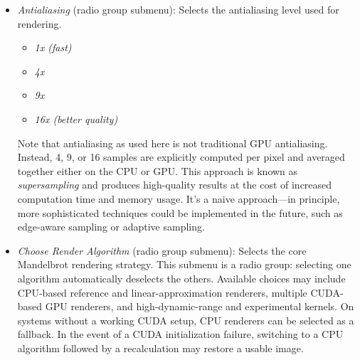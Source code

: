 \begin{itemize}
  \item \emph{Antialiasing} (radio group submenu): Selects the antialiasing
  level used for rendering.
    \begin{itemize}
      \item \emph{1x (fast)}
      \item \emph{4x}
      \item \emph{9x}
      \item \emph{16x (better quality)}
    \end{itemize}

  Note that antialiasing as used here is not traditional GPU antialiasing.
  Instead, 4, 9, or 16 samples are explicitly computed per pixel and averaged
  together either on the CPU or GPU.  This approach is known as
  \emph{supersampling} and produces high-quality results at the cost of
  increased computation time and memory usage.  It's a naive approach---in
  principle, more sophisticated techniques could be implemented in the future,
  such as edge-aware sampling or adaptive sampling.

  \item \emph{Choose Render Algorithm} (radio group submenu): Selects the core
  Mandelbrot rendering strategy. This submenu is a radio group: selecting one algorithm
  automatically deselects the others. Available choices may include CPU-based
  reference and linear-approximation renderers, multiple CUDA-based GPU
  renderers, and high-dynamic-range and experimental kernels. On systems without
  a working CUDA setup, CPU renderers can be selected as a fallback. In the
  event of a CUDA initialization failure, switching to a CPU algorithm followed
  by a recalculation may restore a usable image.


\end{itemize}
